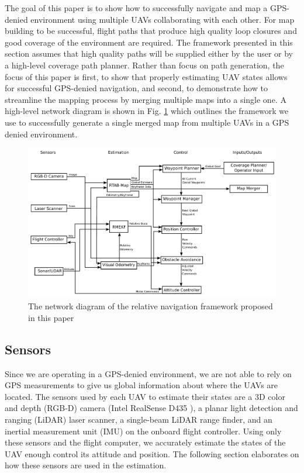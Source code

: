 \documentclass[letterpaper, 10 pt, conference]{ieeeconf}  %
\begin{document}
The goal of this paper is to show how to successfully navigate and map a GPS-denied environment using multiple UAVs collaborating with each other. For map building to be successful, flight paths that produce high quality loop closures and good coverage of the environment are required. The framework presented in this section assumes that high quality paths will be supplied either by the user or by a high-level coverage path planner. Rather than focus on path generation, the focus of this paper is first, to show that properly estimating UAV states allows for successful GPS-denied navigation, and second, to demonstrate how to streamline the mapping process by merging multiple maps into a single one. A high-level network diagram is shown in Fig. \ref{fig:rtab_network} which outlines the framework we use to successfully generate a single merged map from multiple UAVs in a GPS denied environment.

\begin{figure}
\centering
\includegraphics[width=1.0\linewidth]{rtab_relative_nav_network}
\caption{The network diagram of the relative navigation framework proposed in this paper}
\label{fig:rtab_network}
\end{figure}

\subsection{Sensors}

Since we are operating in a GPS-denied environment, we are not able to rely on GPS measurements to give us global information about where the UAVs are located. The sensors used by each UAV to estimate their states are a 3D color and depth (RGB-D) camera (Intel RealSense D435 \cite{Intel}), a planar light detection and ranging (LiDAR) laser scanner, a single-beam LiDAR range finder, and an inertial measurement unit (IMU) on the onboard flight controller. Using only these sensors and the flight computer, we accurately estimate the states of the UAV enough control its attitude and position. The following section elaborates on how these sensors are used in the estimation.
\end{document}
